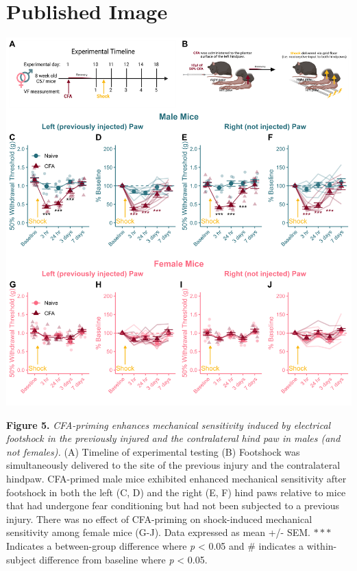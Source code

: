 \documentclass[
]{book}
\begin{document}
\hypertarget{published-image-4}{%
\section*{Published Image}\label{published-image-4}}

\begin{center}\includegraphics[width=77.78in]{Figs/5_Shock_VF} \end{center}

\textbf{Figure 5.} \emph{CFA-priming enhances mechanical sensitivity induced by electrical footshock in the previously injured and the contralateral hind paw in males (and not females).} (A) Timeline of experimental testing (B) Footshock was simultaneously delivered to the site of the previous injury and the contralateral hindpaw. CFA-primed male mice exhibited enhanced mechanical sensitivity after footshock in both the left (C, D) and the right (E, F) hind paws relative to mice that had undergone fear conditioning but had not been subjected to a previous injury. There was no effect of CFA-priming on shock-induced mechanical sensitivity among female mice (G-J). Data expressed as mean +/- SEM. \(***\) Indicates a between-group difference where \emph{p} \textless{} 0.05 and \# indicates a within-subject difference from baseline where \emph{p} \textless{} 0.05.
\end{document}
